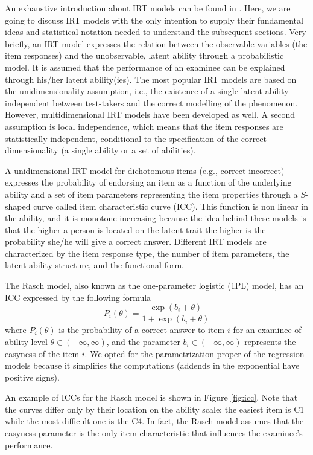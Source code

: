 An exhaustive introduction about IRT models can be found in \textcite{lord1968statistical, Hamb91}.
Here, we are going to discuss IRT models with the only intention to supply their fundamental ideas and statistical notation needed to understand the subsequent sections.
Very briefly, an IRT model expresses the relation between the observable variables (the item responses) and the unobservable, latent ability through a probabilistic model.
It is assumed that the performance of an examinee can be explained through his/her latent ability(ies).
The most popular IRT models are based on the unidimensionality assumption, i.e., the existence of a single latent ability independent between test-takers and the correct modelling of the phenomenon.
However, multidimensional IRT models have been developed as well.
A second assumption is local independence, which means that the item responses are statistically independent, conditional to the specification of the correct dimensionality (a single ability or a set of abilities).

A unidimensional IRT model for dichotomous items (e.g., correct-incorrect) expresses the probability of endorsing an item as a function of the underlying ability and a set of item parameters representing the item properties through a \textit{S}-shaped curve called item characteristic curve (ICC).
This function is non linear in the ability, and it is monotone increasing because the idea behind these models is that the higher a person is located on the latent trait the higher is the probability she/he will give a correct answer.
Different IRT models are characterized by the item response type, the number of item parameters, the latent ability structure, and the functional form.

The Rasch model, also known as the one-parameter logistic (1PL) model, has an ICC expressed by the following formula
\begin{equation}
P_i(\theta)=\frac{\exp(b_i+\theta)}{1+ \exp(b_i+\theta)}
\end{equation}
where $P_i(\theta)$ is the probability of a correct answer to item $i$ for an examinee of ability level $\theta \in (-\infty,\infty)$, and the parameter $b_i \in (-\infty,\infty) $ represents the easyness of the item $i$.
We opted for the parametrization proper of the regression models because it simplifies the computations (addends in the exponential have positive signs).

An example of ICCs for the Rasch model is shown in Figure \ref{fig:icc}.
Note that the curves differ only by their location on the ability scale: the easiest item is C1 while the most difficult one is the C4.
In fact, the Rasch model assumes that the easyness parameter is the only item characteristic that influences the examinee's performance.


